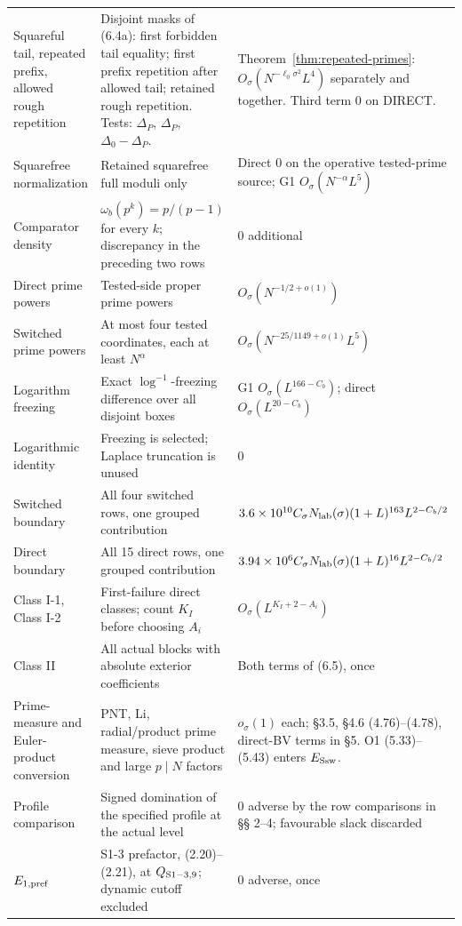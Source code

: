 \begin{longtable}{@{}p{}p{}p{}@{}}
Squareful tail, repeated prefix, allowed rough repetition & Disjoint masks of (6.4a): first forbidden tail equality; first prefix repetition after allowed tail; retained rough repetition. Tests: $\Delta_P$, $\Delta_P$, $\Delta_0-\Delta_P$. & Theorem~\ref{thm:repeated-primes}: $O_\sigma(N^{-\ell_0\sigma^2}L^4)$ separately and together. Third term $0$ on DIRECT. \\
Squarefree normalization & Retained squarefree full moduli only & Direct $0$ on the operative tested-prime source; G1 $O_\sigma(N^{-\alpha}L^5)$ \\
Comparator density & $\omega_b(p^k)=p/(p-1)$ for every $k$; discrepancy in the preceding two rows & $0$ additional \\
Direct prime powers & Tested-side proper prime powers & $O_\sigma(N^{-1/2+o(1)})$ \\
Switched prime powers & At most four tested coordinates, each at least $N^\alpha$ & $O_\sigma(N^{-25/1149+o(1)}L^5)$ \\
Logarithm freezing & Exact $\log^{-1}$-freezing difference over all disjoint boxes & G1 $O_\sigma(L^{166-C_b})$; direct $O_\sigma(L^{20-C_b})$ \\
Logarithmic identity & Freezing is selected; Laplace truncation is unused & $0$ \\
Switched boundary & All four switched rows, one grouped contribution & $3.6\times10^{10}C_\sigma N_{\rm lab}(\sigma)(1+L)^{163}L^{2-C_b/2}$ \\
Direct boundary & All 15 direct rows, one grouped contribution & $3.94\times10^6C_\sigma N_{\rm lab}(\sigma)(1+L)^{16}L^{2-C_b/2}$ \\
Class I-1, Class I-2 & First-failure direct classes; count $K_I$ before choosing $A_i$ & $O_\sigma(L^{K_I+2-A_i})$ \\
Class II & All actual blocks with absolute exterior coefficients & Both terms of (6.5), once \\
Prime-measure and Euler-product conversion & PNT, Li, radial/product prime measure, sieve product and large $p\mid N$ factors & $o_\sigma(1)$ each; \S{}3.5, \S{}4.6 (4.76)--(4.78), direct-BV terms in \S{}5. O1 (5.33)--(5.43) enters $E_{\rm Ssw}$. \\
Profile comparison & Signed domination of the specified profile at the actual level & $0$ adverse by the row comparisons in \S\S{} 2--4; favourable slack discarded \\
$E_{1,\rm pref}$ & S1-3 prefactor, (2.20)--(2.21), at $Q_{\rm S1-3,9}$; dynamic cutoff excluded & $0$ adverse, once \\

\end{longtable}
